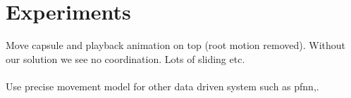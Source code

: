 \section{Experiments}
Move capsule and playback animation on top (root motion removed). Without our solution we see no coordination. Lots of sliding etc.
\\\\
Use precise movement model for other data driven system such as pfnn,. 
